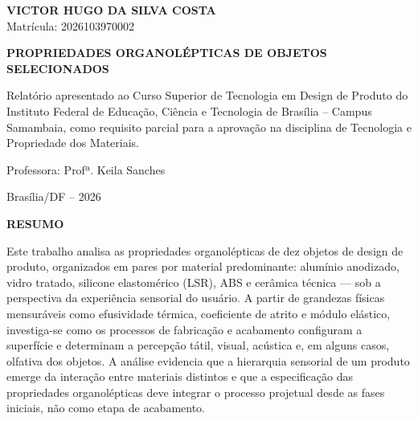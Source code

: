 \documentclass[
  12pt,
  a4paper,
  oneside,
  brazil,
  chapter=TITLE
]{article}
\begin{document}
\begin{titlepage}
  \thispagestyle{empty}
  \begin{center}

    {\normalsize\bfseries VICTOR HUGO DA SILVA COSTA}\\[0.3em]
    {\normalsize Matrícula: 2026103970002}

    \vfill

    {\large\bfseries
      PROPRIEDADES ORGANOLÉPTICAS DE OBJETOS SELECIONADOS
    }

    \vfill

    \begin{flushright}
      \begin{minipage}{0.5\textwidth}
        \normalsize
        Relatório apresentado ao Curso Superior de
        Tecnologia em Design de Produto do Instituto
        Federal de Educação, Ciência e Tecnologia de
        Brasília -- Campus Samambaia, como requisito
        parcial para a aprovação na disciplina de
        Tecnologia e Propriedade dos Materiais.

        \vspace{1em}
        Professora: Profª. Keila Sanches
      \end{minipage}
    \end{flushright}

    \vfill

    {\normalsize Brasília/DF -- 2026}

  \end{center}
\end{titlepage}

\clearpage
\thispagestyle{empty}
\begin{center}
  {\normalsize\bfseries RESUMO}
\end{center}

\vspace{1em}
\noindent
Este trabalho analisa as propriedades organolépticas de dez objetos de design de produto,
organizados em pares por material predominante: alumínio anodizado, vidro tratado,
silicone elastomérico (LSR), ABS e cerâmica técnica --- sob a perspectiva da experiência
sensorial do usuário. A partir de grandezas físicas mensuráveis como efusividade térmica,
coeficiente de atrito e módulo elástico, investiga-se como os processos de fabricação e
acabamento configuram a superfície e determinam a percepção tátil, visual, acústica e,
em alguns casos, olfativa dos objetos. A análise evidencia que a hierarquia sensorial de um
produto emerge da interação entre materiais distintos e que a especificação das propriedades
organolépticas deve integrar o processo projetual desde as fases iniciais, não como etapa
de acabamento.
\end{document}
